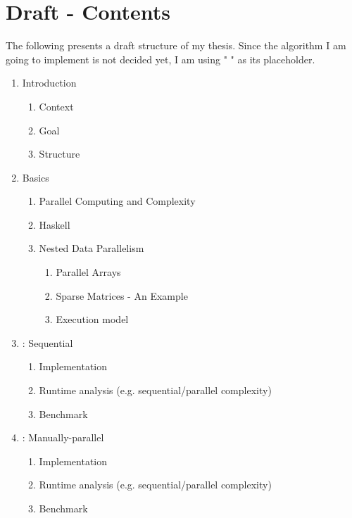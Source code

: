 \documentclass{article}
\begin{document}
    \section{Draft - Contents}

        The following presents a draft structure of my thesis.
        Since the algorithm I am going to implement is not decided yet, I am using " " as its placeholder.

        \begin{enumerate}

        \item Introduction
            \begin{enumerate}
            \item Context
            \item Goal
            \item Structure
            \end{enumerate}

        \item Basics
            \begin{enumerate}
            \item Parallel Computing and Complexity
            \item Haskell
            \item Nested Data Parallelism
                \begin{enumerate}
                \item Parallel Arrays
                \item Sparse Matrices - An Example
                \item Execution model
                \end{enumerate}
            \end{enumerate}

        \item   : Sequential
            \begin{enumerate}
            \item Implementation
            \item Runtime analysis {\tiny (e.g. sequential/parallel complexity)}
            \item Benchmark
            \end{enumerate}

        \item   : Manually-parallel
            \begin{enumerate}
            \item Implementation
            \item Runtime analysis {\tiny (e.g. sequential/parallel complexity)}
            \item Benchmark
            \end{enumerate}


\end{enumerate}
\end{document}
